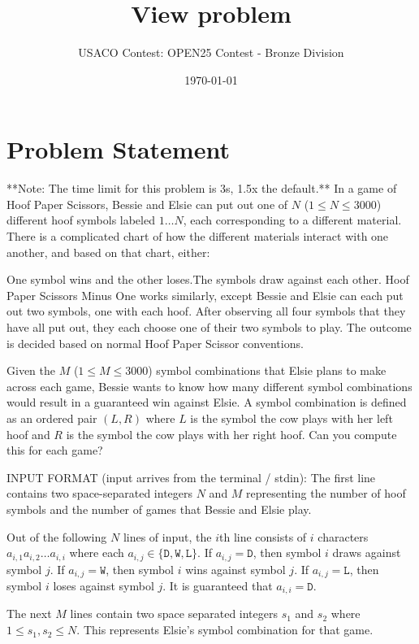 \documentclass[12pt]{article}
\title{View problem}
\author{USACO Contest: OPEN25 Contest - Bronze Division}
\date{\today}
\begin{document}
\maketitle

\section*{Problem Statement}


**Note: The time limit for this problem is 3s, 1.5x the default.**
In a game of Hoof Paper Scissors, Bessie and Elsie can put out one of $N$
($1 \leq N \leq 3000$) different hoof symbols labeled $1\dots N$, each
corresponding to a different material. There is a complicated chart of how the
different materials interact with one another, and based on that chart, either:

One symbol wins and the other loses.The symbols draw against each other.
Hoof Paper Scissors Minus One works similarly, except Bessie and Elsie can each
put out two symbols, one with each hoof. After observing all four symbols that
they have all put out, they each choose one of their two symbols to play.  The
outcome is decided based on normal Hoof Paper Scissor conventions.

Given the $M$ ($1 \leq M \leq 3000$) symbol combinations that Elsie plans to
make across each game, Bessie wants to know how many different symbol
combinations would result in a guaranteed win against Elsie. A symbol
combination is defined as an ordered pair $(L,R)$ where $L$ is the symbol the
cow plays with her left hoof and $R$ is the symbol the cow plays with her right
hoof. Can you compute this for each game?

INPUT FORMAT (input arrives from the terminal / stdin):
The first line contains two space-separated integers $N$ and $M$ representing
the number of hoof symbols and the number of games that Bessie and Elsie play.

Out of the following $N$ lines of input, the $i$th line consists of $i$
characters  $a_{i,1}a_{i,2}\ldots a_{i,i}$ where each
$a_{i,j} \in \{\texttt D,\texttt W,\texttt L\}$. If $a_{i,j} = \texttt D$, then
symbol $i$ draws against symbol $j$.  If $a_{i,j} = \texttt W$, then symbol $i$
wins against symbol $j$. If $a_{i,j} = \texttt L$, then symbol $i$ loses against
symbol $j$. It is guaranteed that $a_{i,i} = \texttt D$.

The next $M$ lines contain two space separated integers $s_1$ and $s_2$ where
$1 \leq s_1,s_2 \leq N$. This represents Elsie's symbol combination for that
game.
\end{document}
